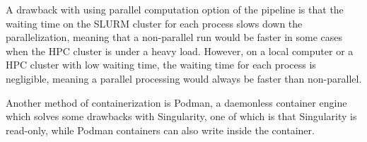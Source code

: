 \documentclass[11pt]{article}
\begin{document}
A drawback with using parallel computation option of the pipeline is that the waiting time on the SLURM cluster for each process slows down the parallelization, meaning that a non-parallel run would be faster in some cases when the HPC cluster is under a heavy load. However, on a local computer or a HPC cluster with low waiting time, the waiting time for each process is negligible, meaning a parallel processing would always be faster than non-parallel.

Another method of containerization is Podman, a daemonless container engine which solves some drawbacks with Singularity, one of which is that Singularity is read-only, while Podman containers can also write inside the container.




\end{document}
